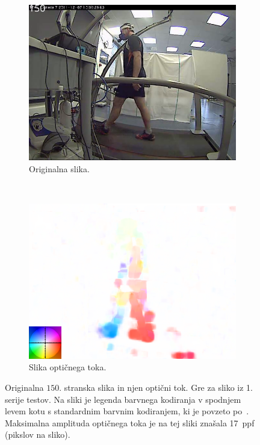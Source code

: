 \begin{figure}[!htb]
	\centering
	\begin{subfigure}{0.45\columnwidth}
		\includegraphics[width=\columnwidth]{./Slike/normal-sv-150.png}
		\caption{Originalna slika.}
	\end{subfigure}
	~
	\begin{subfigure}{0.45\columnwidth}
	    \includegraphics[width=\columnwidth, frame]{./Slike/normal-sv-of-coded-150.png}
		\caption{Slika optičnega toka.}
		\label{fig:stage1-of}
	\end{subfigure}
    \caption[Originalna $150$. stranska slika in optični tok]{Originalna $150$. stranska slika in njen optični tok. Gre za sliko iz 1. serije testov. Na sliki  je legenda barvnega kodiranja v spodnjem levem kotu s standardnim barvnim kodiranjem, ki je povzeto po~\cite{baker2011database}. Maksimalna amplituda optičnega toka je na tej sliki znašala \SI{17}{ppf} (pikslov na sliko).}
    \label{fig:opticni-tok-stage1}
\end{figure}

